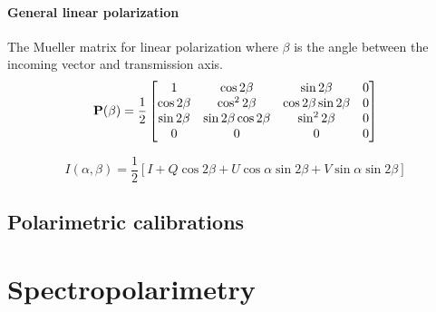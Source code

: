 \paragraph*{General linear polarization}
The Mueller matrix for linear polarization where $\beta$ is the angle between the incoming vector and transmission axis.
\begin{equation}
    \mathbf{P}(\beta) = \frac{1}{2}
    \begin{bmatrix}
        1            & \cos 2 \beta              & \sin 2 \beta              & 0 \\
        \cos 2 \beta & \cos^{2} 2 \beta          & \cos 2 \beta \sin 2 \beta & 0 \\
        \sin 2 \beta & \sin 2 \beta \cos 2 \beta & \sin^{2} 2 \beta          & 0 \\
        0            & 0                         & 0                         & 0 \\
    \end{bmatrix}
    \label{matrix:polarizer}
\end{equation}
\prgph


    

\begin{equation}
    I(\alpha, \beta) = \frac{1}{2} \left[ I + Q \cos2\beta + U \cos\alpha \sin2\beta + V \sin\alpha \sin2\beta\right]
\end{equation}




\subsection{Polarimetric calibrations}



\section{Spectropolarimetry} %

